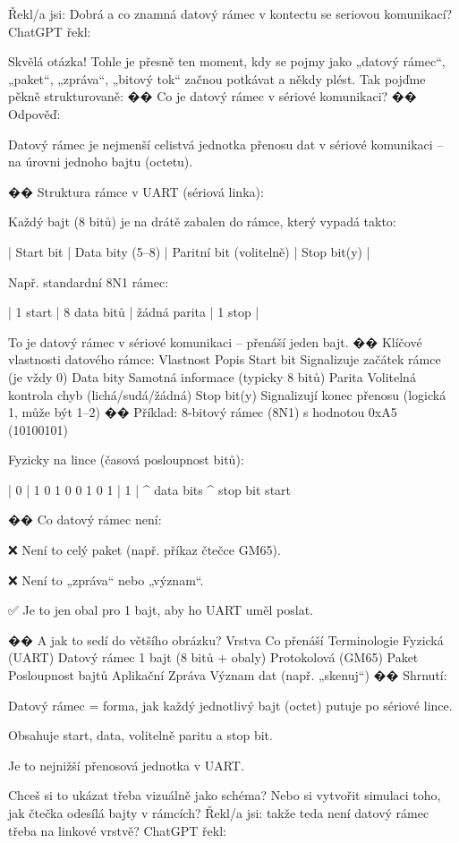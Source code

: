 Řekl/a jsi:
Dobrá a co znamná datový rámec v kontectu se seriovou komunikací?
ChatGPT řekl:

Skvělá otázka! Tohle je přesně ten moment, kdy se pojmy jako „datový rámec“, „paket“, „zpráva“, „bitový tok“ začnou potkávat a někdy plést. Tak pojďme pěkně strukturovaně:
�� Co je datový rámec v sériové komunikaci?
�� Odpověď:

    Datový rámec je nejmenší celistvá jednotka přenosu dat v sériové komunikaci – na úrovni jednoho bajtu (octetu).

�� Struktura rámce v UART (sériová linka):

Každý bajt (8 bitů) je na drátě zabalen do rámce, který vypadá takto:

| Start bit | Data bity (5–8) | Paritní bit (volitelně) | Stop bit(y) |

Např. standardní 8N1 rámec:

| 1 start | 8 data bitů | žádná parita | 1 stop |

To je datový rámec v sériové komunikaci – přenáší jeden bajt.
�� Klíčové vlastnosti datového rámce:
Vlastnost	Popis
Start bit	Signalizuje začátek rámce (je vždy 0)
Data bity	Samotná informace (typicky 8 bitů)
Parita	Volitelná kontrola chyb (lichá/sudá/žádná)
Stop bit(y)	Signalizují konec přenosu (logická 1, může být 1–2)
�� Příklad: 8-bitový rámec (8N1) s hodnotou 0xA5 (10100101)

Fyzicky na lince (časová posloupnost bitů):

| 0 | 1 0 1 0 0 1 0 1 | 1 |
  ^    data bits      ^ stop bit
start

�� Co datový rámec není:

    ❌ Není to celý paket (např. příkaz čtečce GM65).

    ❌ Není to „zpráva“ nebo „význam“.

    ✅ Je to jen obal pro 1 bajt, aby ho UART uměl poslat.

�� A jak to sedí do většího obrázku?
Vrstva	Co přenáší	Terminologie
Fyzická (UART)	Datový rámec	1 bajt (8 bitů + obaly)
Protokolová (GM65)	Paket	Posloupnost bajtů
Aplikační	Zpráva	Význam dat (např. „skenuj“)
�� Shrnutí:

    Datový rámec = forma, jak každý jednotlivý bajt (octet) putuje po sériové lince.

    Obsahuje start, data, volitelně paritu a stop bit.

    Je to nejnižší přenosová jednotka v UART.

Chceš si to ukázat třeba vizuálně jako schéma? Nebo si vytvořit simulaci toho, jak čtečka odesílá bajty v rámcích?
Řekl/a jsi:
takže teda není datový rámec třeba na linkové vrstvě?
ChatGPT řekl:

